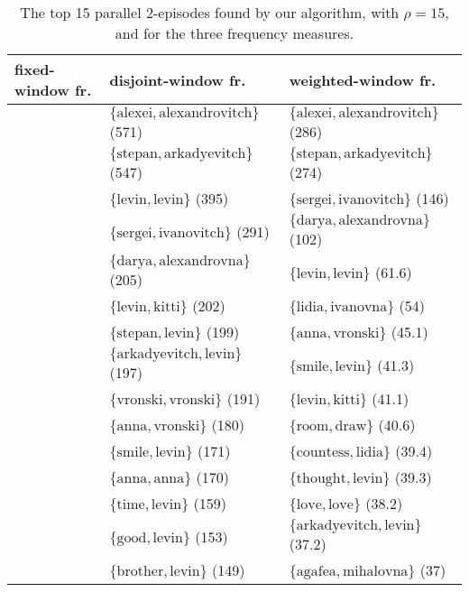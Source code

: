 \begin{table}


\begin{tabulary}{\textwidth}{L|L|L}

fixed-window fr. & disjoint-window fr. & weighted-window fr. \\
\hline
& $ \{ \text{alexei}, \text{alexandrovitch} \} $ (571) & $ \{ \text{alexei}, \text{alexandrovitch} \} $ (286) \\
& $ \{ \text{stepan}, \text{arkadyevitch} \} $ (547) & $ \{ \text{stepan}, \text{arkadyevitch} \} $ (274) \\
& $ \{ \text{levin}, \text{levin} \} $ (395) & $ \{ \text{sergei}, \text{ivanovitch} \} $ (146) \\
& $ \{ \text{sergei}, \text{ivanovitch} \} $ (291) & $ \{ \text{darya}, \text{alexandrovna} \} $ (102) \\
& $ \{ \text{darya}, \text{alexandrovna} \} $ (205) & $ \{ \text{levin}, \text{levin} \} $ (61.6) \\
& $ \{ \text{levin}, \text{kitti} \} $ (202) & $ \{ \text{lidia}, \text{ivanovna} \} $ (54) \\
& $ \{ \text{stepan}, \text{levin} \} $ (199) & $ \{ \text{anna}, \text{vronski} \} $ (45.1) \\
& $ \{ \text{arkadyevitch}, \text{levin} \} $ (197) & $ \{ \text{smile}, \text{levin} \} $ (41.3) \\
& $ \{ \text{vronski}, \text{vronski} \} $ (191) & $ \{ \text{levin}, \text{kitti} \} $ (41.1) \\
& $ \{ \text{anna}, \text{vronski} \} $ (180) & $ \{ \text{room}, \text{draw} \} $ (40.6) \\
& $ \{ \text{smile}, \text{levin} \} $ (171) & $ \{ \text{countess}, \text{lidia} \} $ (39.4) \\
& $ \{ \text{anna}, \text{anna} \} $ (170) & $ \{ \text{thought}, \text{levin} \} $ (39.3) \\
& $ \{ \text{time}, \text{levin} \} $ (159) & $ \{ \text{love}, \text{love} \} $ (38.2) \\
& $ \{ \text{good}, \text{levin} \} $ (153) & $ \{ \text{arkadyevitch}, \text{levin} \} $ (37.2) \\
& $ \{ \text{brother}, \text{levin} \} $ (149) & $ \{ \text{agafea}, \text{mihalovna} \} $ (37) \\

\end{tabulary}

\caption{The top 15 parallel 2-episodes found by our algorithm, with $ \rho = 15 $, and for the three frequency measures.}
\label{table:fmw-tolstoy-top-15-all-episodes}
\end{table}

